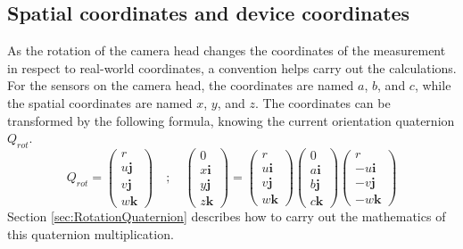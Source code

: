 \subsection{Spatial coordinates and device coordinates}
\label{sec:ABC_XYZ_coords}
As the rotation of the camera head changes the coordinates of the measurement in respect to real-world coordinates, a convention helps carry out the calculations. For the sensors on the camera head, the coordinates are named $a$, $b$, and $c$, while the spatial coordinates are named $x$, $y$, and $z$.
The coordinates can be transformed by the following formula, knowing the current orientation quaternion $Q_{rot}$.   
\begin{equation*}
    Q_{rot}
    =
    \begin{pmatrix}
        r           \\
        u\textbf{j} \\
        v\textbf{j} \\
        w\textbf{k}
    \end{pmatrix}
    \quad ; \quad
    \begin{pmatrix}
        0           \\
        x\textbf{i} \\
        y\textbf{j} \\
        z\textbf{k}
    \end{pmatrix}
    =
    \begin{pmatrix}
        r           \\
        u\textbf{i} \\
        v\textbf{j} \\
        w\textbf{k}
    \end{pmatrix}
    \begin{pmatrix}
        0           \\
        a\textbf{i} \\
        b\textbf{j} \\
        c\textbf{k}
    \end{pmatrix}
    \begin{pmatrix}
        r           \\
        -u\textbf{i} \\
        -v\textbf{j} \\
        -w\textbf{k}
    \end{pmatrix}
\end{equation*}
Section \ref{sec:RotationQuaternion} describes how to carry out the mathematics of this quaternion multiplication. 
